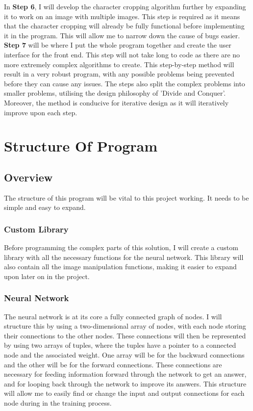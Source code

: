 \documentclass{report}
\begin{document}
\newline
\newline
In \textbf{Step 6}, I will develop the character cropping algorithm further by expanding it to work on an image with multiple images. This step is required as it means that the character cropping will already be fully functional before implementing it in the program. This will allow me to narrow down the cause of bugs easier.
\newline
\newline
\textbf{Step 7} will be where I put the whole program together and create the user interface for the front end. This step will not take long to code as there are no more extremely complex algorithms to create.
\newline
\newline
This step-by-step method will result in a very robust program, with any possible problems being prevented before they can cause any issues. The steps also split the complex problems into smaller problems, utilising the design philosophy of 'Divide and Conquer'. Moreover, the method is conducive for iterative design as it will iteratively improve upon each step.
\newpage


\section{Structure Of Program}

\subsection{Overview}
The structure of this program will be vital to this project working. It needs to be simple and easy to expand.

\subsubsection{Custom Library}
Before programming the complex parts of this solution, I will create a custom library with all the necessary functions for the neural network. This library will also contain all the image manipulation functions, making it easier to expand upon later on in the project.

\subsubsection{Neural Network}
The neural network is at its core a fully connected graph of nodes. I will structure this by using a two-dimensional array of nodes, with each node storing their connections to the other nodes. These connections will then be represented by using two arrays of tuples, where the tuples have a pointer to a connected node and the associated weight. One array will be for the backward connections and the other will be for the forward connections. 
\newline
These connections are necessary for feeding information forward through the network to get an answer, and for looping back through the network to improve its answers. This structure will allow me to easily find or change the input and output connections for each node during in the training process.
\end{document}
